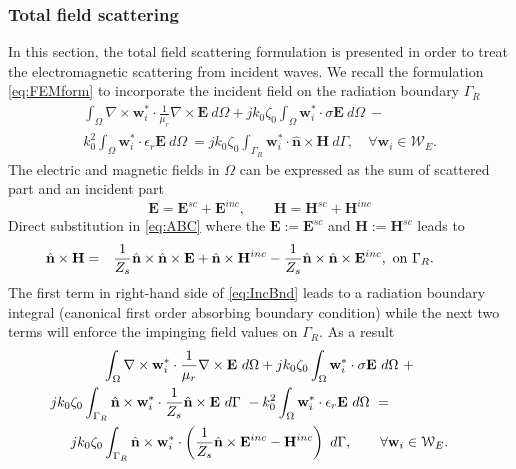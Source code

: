 \subsubsection{Total field scattering}

In this section, the total field scattering formulation is presented in order to treat the electromagnetic scattering from incident waves. We recall the formulation \eqref{eq:FEMform} to incorporate the incident field on the radiation boundary $\Gamma_R$
\begin{multline}
\label{eq:FEMformScatt1}
\int_\Omega \nabla \times \mathbf{w}_i^* \cdot \frac{1}{\mu_r} \nabla \times \mathbf{E} \ d\Omega +
 j k_0 \zeta_0 \int_\Omega \mathbf{w}_i^* \cdot \sigma \mathbf{E} \ d\Omega \ - \\ 
 k_0^2 \int_\Omega \mathbf{w}_i^* \cdot \epsilon_r \mathbf{E} \ d\Omega \ = 
 j k_0 \zeta_0 \int_{\Gamma_{R}} \mathbf{w}_i^* \cdot \hat{\mathbf{n}} \times \mathbf{H} \ d\Gamma, \quad \forall \mathbf{w}_i \in \mathcal{W}_E.
\end{multline}
%
\noindent The electric and magnetic fields in $\Omega$ can be expressed as the sum of scattered part and an incident part
$$\mathbf{E} = \mathbf{E}^{sc} + \mathbf{E}^{inc}, \qquad \mathbf{H} = \mathbf{H}^{sc} + \mathbf{H}^{inc} $$
\noindent Direct substitution in \eqref{eq:ABC} where the $\mathbf{E} := \mathbf{E}^{sc}$ and $\mathbf{H} := \mathbf{H}^{sc}$ leads to
\begin{eqnarray}
\label{eq:IncBnd}
\hspace{-1cm}\hat{\mathbf{n}} \times \mathbf{H} & = & \frac{1}{Z_s} \hat{\mathbf{n}} \times \hat{\mathbf{n}} \times \mathbf{E} + \hat{\mathbf{n}} \times \mathbf{H}^{inc} - \frac{1}{Z_s} \hat{\mathbf{n}} \times \hat{\mathbf{n}} \times \mathbf{E}^{inc}, \ \mathrm{on} \ \Gamma_{R}.
\end{eqnarray}
\noindent The first term in right-hand side of \eqref{eq:IncBnd} leads to a radiation boundary integral (canonical first order absorbing boundary condition) while the next two terms will enforce the impinging field values on $\Gamma_R$. As a result
\begin{multline}
\label{eq:FEMformScatt}
\int_\Omega \nabla \times \mathbf{w}_i^* \cdot \frac{1}{\mu_r} \nabla \times \mathbf{E} \ d\Omega + j k_0 \zeta_0 \int_\Omega \mathbf{w}_i^* \cdot \sigma \mathbf{E} \ d\Omega \ + \\
\hspace{-2cm} j k_0 \zeta_0 \int_{\mathrm{\Gamma}_R} \hat{\mathbf{n}} \times \mathbf{w}_i^* \cdot \frac{1}{Z_s} \hat{\mathbf{n}} \times \mathbf{E} \ d\mathrm{\Gamma} \ - 
 k_0^2 \int_\Omega \mathbf{w}_i^* \cdot \epsilon_r \mathbf{E} \ d\Omega \ = \\
 j k_0 \zeta_0 \int_{\Gamma_{R}} \hat{\mathbf{n}} \times \mathbf{w}_i^* \cdot \left( \frac{1}{Z_s} \hat{\mathbf{n}} \times \mathbf{E}^{inc} - \mathbf{H}^{inc} \right) \ d\Gamma, \qquad \forall \mathbf{w}_i \in \mathcal{W}_E.
\end{multline}

